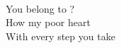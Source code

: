   \songwordfb{~} \\
You belong to  ? \songwordfb{~} \\
How my poor heart  \songwordfb{~} \\
With every step you \songwordfb{~} take \songwordfb{~} \\
